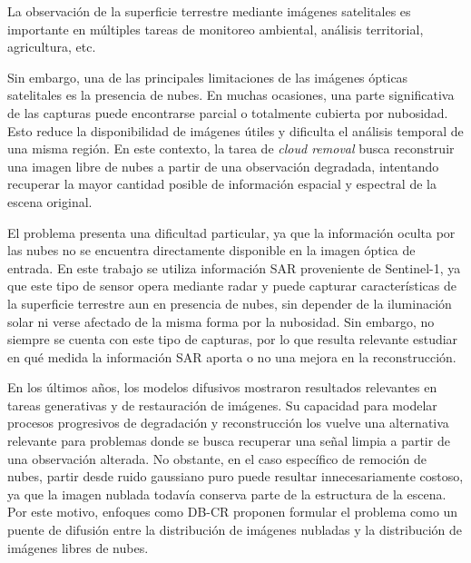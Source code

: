 La observación de la superficie terrestre mediante imágenes satelitales es importante en múltiples tareas de monitoreo ambiental, análisis territorial, agricultura, etc.

Sin embargo, una de las principales limitaciones de las imágenes ópticas satelitales es la presencia de nubes. En muchas ocasiones, una parte significativa de las capturas puede encontrarse parcial o totalmente cubierta por nubosidad. Esto reduce la disponibilidad de imágenes útiles y dificulta el análisis temporal de una misma región. En este contexto, la tarea de \textit{cloud removal} busca reconstruir una imagen libre de nubes a partir de una observación degradada, intentando recuperar la mayor cantidad posible de información espacial y espectral de la escena original.

El problema presenta una dificultad particular, ya que la información oculta por las nubes no se encuentra directamente disponible en la imagen óptica de entrada. En este trabajo se utiliza información SAR proveniente de Sentinel-1, ya que este tipo de sensor opera mediante radar y puede capturar características de la superficie terrestre aun en presencia de nubes, sin depender de la iluminación solar ni verse afectado de la misma forma por la nubosidad.  Sin embargo, no siempre se cuenta con este tipo de capturas, por lo que resulta relevante estudiar en qué medida la información SAR aporta o no una mejora en la reconstrucción.



En los últimos años, los modelos difusivos mostraron resultados relevantes en tareas generativas y de restauración de imágenes. Su capacidad para modelar procesos progresivos de degradación y reconstrucción los vuelve una alternativa relevante para problemas donde se busca recuperar una señal limpia a partir de una observación alterada. No obstante, en el caso específico de remoción de nubes, partir desde ruido gaussiano puro puede resultar innecesariamente costoso, ya que la imagen nublada todavía conserva parte de la estructura de la escena. Por este motivo, enfoques como DB-CR proponen formular el problema como un puente de difusión entre la distribución de imágenes nubladas y la distribución de imágenes libres de nubes.

